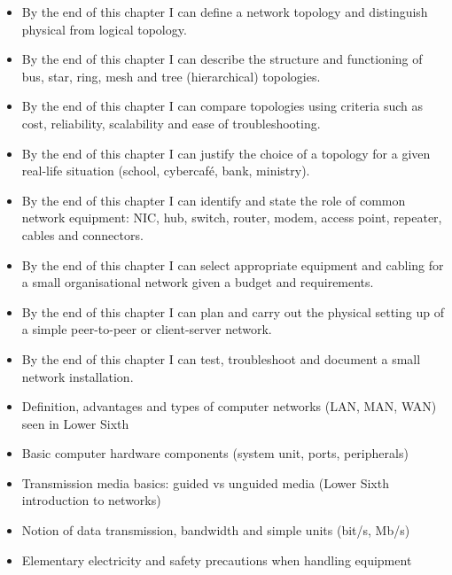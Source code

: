 \documentclass[11pt]{article}
\begin{document}
\begin{objectifs}
\begin{itemize}
\item By the end of this chapter I can define a network topology and distinguish physical from logical topology.
\item By the end of this chapter I can describe the structure and functioning of bus, star, ring, mesh and tree (hierarchical) topologies.
\item By the end of this chapter I can compare topologies using criteria such as cost, reliability, scalability and ease of troubleshooting.
\item By the end of this chapter I can justify the choice of a topology for a given real-life situation (school, cybercafé, bank, ministry).
\item By the end of this chapter I can identify and state the role of common network equipment: NIC, hub, switch, router, modem, access point, repeater, cables and connectors.
\item By the end of this chapter I can select appropriate equipment and cabling for a small organisational network given a budget and requirements.
\item By the end of this chapter I can plan and carry out the physical setting up of a simple peer-to-peer or client-server network.
\item By the end of this chapter I can test, troubleshoot and document a small network installation.
\end{itemize}
\end{objectifs}

\begin{prerequis}
\begin{itemize}
\item Definition, advantages and types of computer networks (LAN, MAN, WAN) seen in Lower Sixth
\item Basic computer hardware components (system unit, ports, peripherals)
\item Transmission media basics: guided vs unguided media (Lower Sixth introduction to networks)
\item Notion of data transmission, bandwidth and simple units (bit/s, Mb/s)
\item Elementary electricity and safety precautions when handling equipment
\end{itemize}
\end{prerequis}

\newpage
\end{document}
